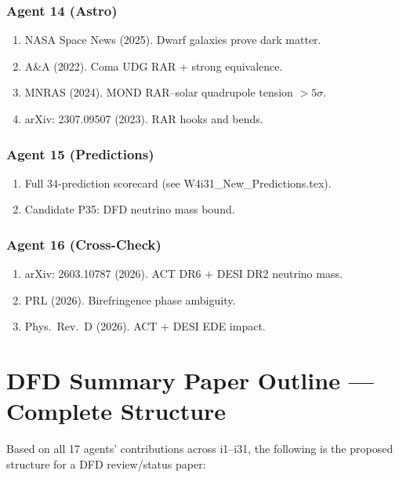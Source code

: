 \documentclass[11pt,a4paper]{article}
\begin{document}
\subsubsection{Agent 14 (Astro)}
\begin{enumerate}
\item NASA Space News (2025). Dwarf galaxies prove dark matter.
\item A\&A (2022). Coma UDG RAR + strong equivalence.
\item MNRAS (2024). MOND RAR--solar quadrupole tension $> 5\sigma$.
\item arXiv: 2307.09507 (2023). RAR hooks and bends.
\end{enumerate}

\subsubsection{Agent 15 (Predictions)}
\begin{enumerate}
\item Full 34-prediction scorecard (see W4i31\_New\_Predictions.tex).
\item Candidate P35: DFD neutrino mass bound.
\end{enumerate}

\subsubsection{Agent 16 (Cross-Check)}
\begin{enumerate}
\item arXiv: 2603.10787 (2026). ACT DR6 + DESI DR2 neutrino mass.
\item PRL (2026). Birefringence phase ambiguity.
\item Phys.\ Rev.\ D (2026). ACT + DESI EDE impact.
\end{enumerate}

\section{DFD Summary Paper Outline --- Complete Structure}

Based on all 17 agents' contributions across i1--i31, the following is the proposed structure for a DFD review/status paper:
\end{document}
